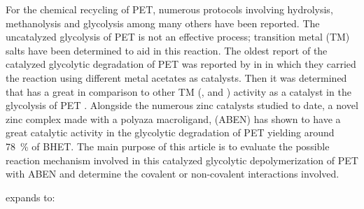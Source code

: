 For the chemical recycling of PET, numerous protocols involving hydrolysis, methanolysis and glycolysis among many others \cite{Campanelli1993,Campanelli1994,Campanelli1994a} have been reported. The uncatalyzed glycolysis of PET is not an effective process; transition metal (TM) salts have been determined to aid in this reaction. The oldest report of the catalyzed glycolytic degradation of PET was reported by \citeauthor{Vaidya1988} in \citeyear{Vaidya1988} \cite{Vaidya1988} in which they carried the reaction using different metal acetates as catalysts. Then it was determined that  has a great in comparison to other TM (,  and ) activity as a catalyst in the glycolysis of PET \cite{Ghaemy2005}. Alongside the numerous zinc catalysts studied to date, a novel zinc complex made with a polyaza macroligand,  (ABEN) \cite{Elizondo-Martinez2013} has shown to have a great catalytic activity in the glycolytic degradation of PET yielding around \SI{78}{\percent} of BHET\cite{Ovalle-Sanchez2017}. The main purpose of this article is to evaluate the possible reaction mechanism involved in this catalyzed glycolytic depolymerization of PET with ABEN and determine the covalent or non-covalent interactions involved.

expands to:
{}